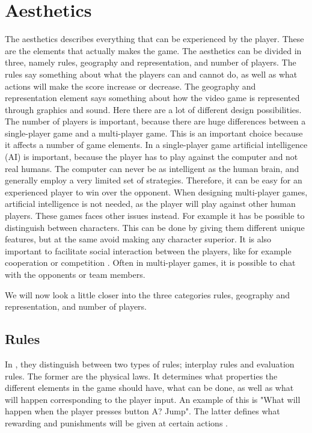 \section{Aesthetics}
The aesthetics describes everything that can be experienced by the player. These are the elements that actually makes the game. The aesthetics can be divided in three, namely rules, geography and representation, and number of players. The rules say something about what the players can and cannot do, as well as what actions will make the score increase or decrease. The geography and representation element says something about how the video game is represented through graphics and sound. Here there are a lot of different design possibilities. The number of players is important, because there are huge differences between a single-player game and a multi-player game. This is an important choice because it affects a number of game elements. In a single-player game artificial intelligence (AI) is important, because the player has to play against the computer and not real humans. The computer can never be as intelligent as the human brain, and generally employ a very limited set of strategies. Therefore, it can be easy for an experienced player to win over the opponent. When designing multi-player games, artificial intelligence is not needed, as the player will play against other human players. These games faces other issues instead. For example it has be possible to distinguish between characters. This can be done by giving them different unique features, but at the same avoid making any character superior. It is also important to facilitate social interaction between the players, like for example cooperation or competition \cite{understandingvg}. Often in multi-player games, it is possible to chat with the opponents or team members.

We will now look a little closer into the three categories rules, geography and representation, and number of players.

\subsection{Rules}
In \cite{understandingvg}, they distinguish between two types of rules; interplay rules and evaluation rules. The former are the physical laws. It determines what properties the different elements in the game should have, what can be done, as well as what will happen corresponding to the player input. An example of this is "What will happen when the player presses button A? Jump". The latter defines what rewarding and punishments will be given at certain actions \cite{understandingvg}. 

